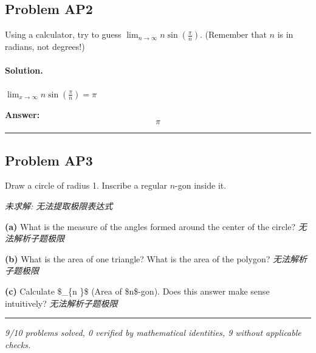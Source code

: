 \documentclass[12pt, a4paper]{article}
\newcommand{\problem}[1]{\subsection*{Problem #1}}
\newcommand{\solution}{\paragraph{Solution.}}
\begin{document}
\problem{AP2}

Using a calculator, try to guess $\lim_{n \to \infty} n \sin(\frac{\pi}{n})$. (Remember that $n$ is in radians, not degrees!)

\solution

$\lim_{x \to \infty} n \sin{\left(\frac{\pi}{n} \right)} = \pi$

\textbf{Answer:}
\[\pi\]

\vspace{1em}
\hrule
\vspace{1em}

\problem{AP3}

Draw a circle of radius 1. Inscribe a regular $n$-gon inside it.

\textit{\color{red} 未求解: 无法提取极限表达式}

\textbf{(a)}
What is the measure of the angles formed around the center of the circle?
\textit{\color{red} 无法解析子题极限}

\textbf{(b)}
What is the area of one triangle? What is the area of the polygon?
\textit{\color{red} 无法解析子题极限}

\textbf{(c)}
Calculate \$\lim\_\{n \to \infty\}\$ (Area of \$n\$-gon). Does this answer make sense intuitively?
\textit{\color{red} 无法解析子题极限}

\vspace{1em}
\hrule
\vspace{1em}

\vspace{2em}
\noindent\textit{9/10 problems solved, 0 verified by mathematical identities, 9 without applicable checks.}
\end{document}
